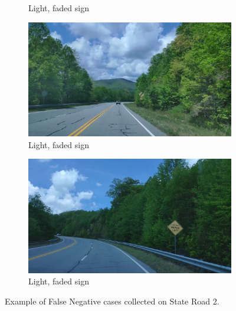\begin{figure}
\begin{center}
\begin{subfigure}[t]{.49\linewidth}
      \caption{Light, faded sign}
    \end{subfigure}
    \begin{subfigure}[t]{.49\linewidth}
      \centering
      \includegraphics[width=0.99\linewidth]{figures/examples/sr2/FN/FN_07.png}
      \caption{Light, faded sign}
    \end{subfigure}
    \begin{subfigure}[t]{.49\linewidth}
      \centering
      \includegraphics[width=0.99\linewidth]{figures/examples/sr2/FN/FN_08.png}
      \caption{Light, faded sign}
    \end{subfigure}
    \caption{Example of False Negative cases collected on State Road 2.}
    \label{fig:FNcases}
  \end{center}
\end{figure}

